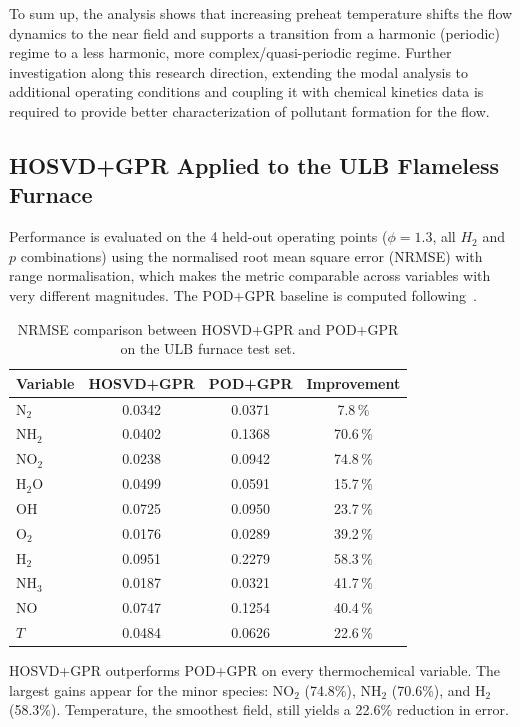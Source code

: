 To sum up, the analysis shows that increasing preheat temperature shifts the flow dynamics to the near field and supports a transition from a harmonic (periodic) regime to a less harmonic, more complex/quasi-periodic regime.
 Further investigation along this research direction, extending the modal analysis to additional operating conditions and coupling it with chemical kinetics data is required to provide better characterization of pollutant formation for the flow.

\subsection{HOSVD+GPR Applied to the ULB Flameless Furnace}
\label{sec:results_ulb}

Performance is evaluated on the 4 held-out operating points ($\phi = 1.3$, all $H_2$ and $p$ combinations) using the normalised root mean square error (NRMSE) with range normalisation, which makes the metric comparable across variables with very different magnitudes. The POD+GPR baseline is computed following~\cite{aversano2021digital}.

\FloatBarrier
\begin{table}[htbp]
\centering
\caption{NRMSE comparison between HOSVD+GPR and POD+GPR on the ULB furnace test set.}
\label{tab:nrmse_ulb}
\begin{tabular}{lccc}
\toprule
Variable & HOSVD+GPR & POD+GPR & Improvement \\
\midrule
N$_2$   & 0.0342 & 0.0371 &  7.8\,\% \\
NH$_2$  & 0.0402 & 0.1368 & 70.6\,\% \\
NO$_2$  & 0.0238 & 0.0942 & 74.8\,\% \\
H$_2$O  & 0.0499 & 0.0591 & 15.7\,\% \\
OH      & 0.0725 & 0.0950 & 23.7\,\% \\
O$_2$   & 0.0176 & 0.0289 & 39.2\,\% \\
H$_2$   & 0.0951 & 0.2279 & 58.3\,\% \\
NH$_3$  & 0.0187 & 0.0321 & 41.7\,\% \\
NO      & 0.0747 & 0.1254 & 40.4\,\% \\
$T$     & 0.0484 & 0.0626 & 22.6\,\% \\
\bottomrule
\end{tabular}
\end{table}
\FloatBarrier

HOSVD+GPR outperforms POD+GPR on every thermochemical variable. The largest gains appear for the minor species: NO$_2$ (74.8\%), NH$_2$ (70.6\%), and H$_2$ (58.3\%). Temperature, the smoothest field, still yields a 22.6\% reduction in error.


